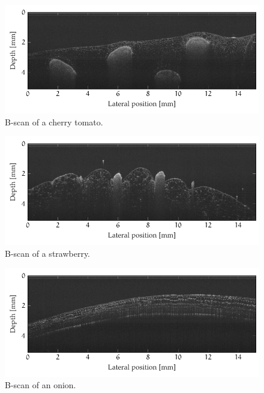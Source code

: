 \begin{figure}[hbt]
	\centering
	\includegraphics[width=0.9\linewidth]{gfx/ch4/axsun/no-bande/tomato-1}
	\caption{B-scan of a cherry tomato.}\label{fig:tomato-1}
\end{figure}

\begin{figure}[htb]
	\centering
	\includegraphics[width=0.9\linewidth]{gfx/ch4/axsun/no-bande/strawberry-1}
	\caption{B-scan of a strawberry.}\label{fig:strawberry}
\end{figure}	

\begin{figure}[htb]
	\centering
	\includegraphics[width=0.9\linewidth]{gfx/ch4/axsun/no-bande/red-onion-2}
	\caption{B-scan of an onion.}\label{fig:red-onion-2}
\end{figure}

